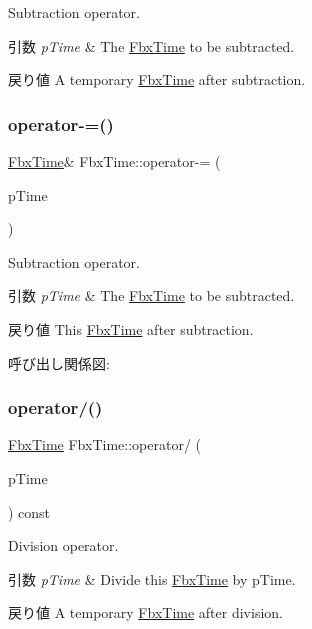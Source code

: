 Subtraction operator. 
\begin{DoxyParams}{引数}
{\em p\+Time} & The \hyperlink{class_fbx_time}{Fbx\+Time} to be subtracted. \\
\hline
\end{DoxyParams}
\begin{DoxyReturn}{戻り値}
A temporary \hyperlink{class_fbx_time}{Fbx\+Time} after subtraction. 
\end{DoxyReturn}
\mbox{\label{class_fbx_time_a66c56bd9467f4480dff65b0686593f8f}} 
\subsubsection{\texorpdfstring{operator-\/=()}{operator-=()}}
{\footnotesize\ttfamily \hyperlink{class_fbx_time}{Fbx\+Time}\& Fbx\+Time\+::operator-\/= (\begin{DoxyParamCaption}\item[{const \hyperlink{class_fbx_time}{Fbx\+Time} \&}]{p\+Time }\end{DoxyParamCaption})}

Subtraction operator. 
\begin{DoxyParams}{引数}
{\em p\+Time} & The \hyperlink{class_fbx_time}{Fbx\+Time} to be subtracted. \\
\hline
\end{DoxyParams}
\begin{DoxyReturn}{戻り値}
This \hyperlink{class_fbx_time}{Fbx\+Time} after subtraction. 
\end{DoxyReturn}
呼び出し関係図\+:
\mbox{\label{class_fbx_time_ad135636b4c52caa325aa174650f33bc0}} 
\subsubsection{\texorpdfstring{operator/()}{operator/()}}
{\footnotesize\ttfamily \hyperlink{class_fbx_time}{Fbx\+Time} Fbx\+Time\+::operator/ (\begin{DoxyParamCaption}\item[{const \hyperlink{class_fbx_time}{Fbx\+Time} \&}]{p\+Time }\end{DoxyParamCaption}) const}

Division operator. 
\begin{DoxyParams}{引数}
{\em p\+Time} & Divide this \hyperlink{class_fbx_time}{Fbx\+Time} by p\+Time. \\
\hline
\end{DoxyParams}
\begin{DoxyReturn}{戻り値}
A temporary \hyperlink{class_fbx_time}{Fbx\+Time} after division. 
\end{DoxyReturn}
\mbox{\label{class_fbx_time_afb7a54c305cd31c35bb0d7f26a86b647}} 

